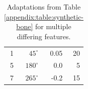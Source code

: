 \documentclass[pdftex,12pt,a4paper]{report}
\begin{document}
\begin{table}[h]
	\begin{center}
		\begin{tabular}{|r|r|r|r|}
			\hline
			\makebox[1cm]{$i$} & \makebox[1cm]{$\mu_i$} & \makebox[1cm]{$h_i$} & \makebox[1cm]{$\sigma_i$} \\
			\hline
			\hline 1 & $45^\circ$ & 0.05 & 20 \\
			\hline 5 & $180^\circ$ & 0.0 & 5 \\
			\hline 7 & $265^\circ$ & -0.2 & 15 \\
			\hline
		\end{tabular}
	\end{center}
	\caption{Adaptations from Table \ref{appendix:table:synthetic-bone} for multiple differing features.}
	\label{appendix:table:synthetic-bone-all}
\end{table}

\listoffigures

\listoftables

\end{document}
